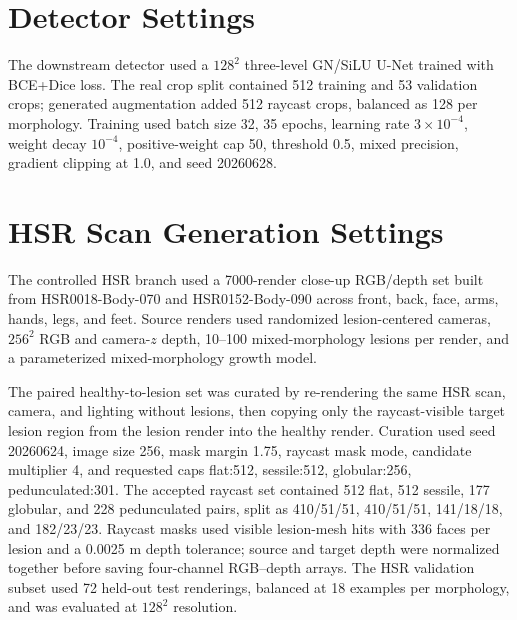 \documentclass[runningheads]{llncs}
\begin{document}
\section{Detector Settings}
The downstream detector used a $128^2$ three-level GN/SiLU U-Net trained with BCE+Dice loss. The real crop split contained 512 training and 53 validation crops; generated augmentation added 512 raycast crops, balanced as 128 per morphology. Training used batch size 32, 35 epochs, learning rate $3\times10^{-4}$, weight decay $10^{-4}$, positive-weight cap 50, threshold 0.5, mixed precision, gradient clipping at 1.0, and seed 20260628.

\section{HSR Scan Generation Settings}
The controlled HSR branch used a 7000-render close-up RGB/depth set built from HSR0018-Body-070 and HSR0152-Body-090 across front, back, face, arms, hands, legs, and feet. Source renders used randomized lesion-centered cameras, $256^2$ RGB and camera-$z$ depth, 10--100 mixed-morphology lesions per render, and a parameterized mixed-morphology growth model.

The paired healthy-to-lesion set was curated by re-rendering the same HSR scan, camera, and lighting without lesions, then copying only the raycast-visible target lesion region from the lesion render into the healthy render. Curation used seed 20260624, image size 256, mask margin 1.75, raycast mask mode, candidate multiplier 4, and requested caps flat:512, sessile:512, globular:256, pedunculated:301. The accepted raycast set contained 512 flat, 512 sessile, 177 globular, and 228 pedunculated pairs, split as 410/51/51, 410/51/51, 141/18/18, and 182/23/23. Raycast masks used visible lesion-mesh hits with 336 faces per lesion and a 0.0025 m depth tolerance; source and target depth were normalized together before saving four-channel RGB--depth arrays. The HSR validation subset used 72 held-out test renderings, balanced at 18 examples per morphology, and was evaluated at $128^2$ resolution.
\end{document}
